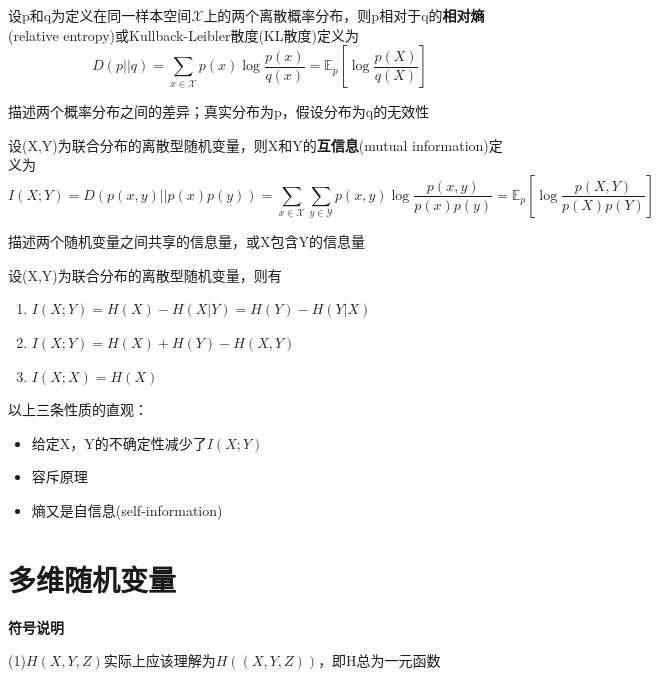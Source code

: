 \documentclass{ctexbook}
\begin{document}
\begin{definition}[相对熵]
    设p和q为定义在同一样本空间$\mathcal{X}$上的两个离散概率分布，则p相对于q的\textbf{相对熵}(relative entropy)或Kullback-Leibler散度(KL散度)定义为
    \[D(p||q) = \sum_{x \in \mathcal{X}} p(x) \log \frac{p(x)}{q(x)} = \mathbb{E} _p\left[\log \frac{p(X)}{q(X)}\right]\]
\end{definition}
\begin{remark}
    描述两个概率分布之间的差异；真实分布为p，假设分布为q的无效性
\end{remark}

\begin{definition}[互信息]
    设(X,Y)为联合分布的离散型随机变量，则X和Y的\textbf{互信息}(mutual information)定义为
    \[I(X;Y) = D(p(x,y)||p(x)p(y)) = \sum_{x \in \mathcal{X}} \sum_{y \in \mathcal{Y}} p(x,y) \log \frac{p(x,y)}{p(x)p(y)} = \mathbb{E} _p\left[\log \frac{p(X,Y)}{p(X)p(Y)}\right]\]
\end{definition}
\begin{remark}
    描述两个随机变量之间共享的信息量，或X包含Y的信息量
\end{remark}

\begin{proposition}[互信息的性质]
    设(X,Y)为联合分布的离散型随机变量，则有
    \begin{enumerate}
        \item $I(X;Y) = H(X) - H(X|Y) = H(Y) - H(Y|X)$
        \item $I(X;Y) = H(X) + H(Y) - H(X,Y)$
        \item $I(X;X) = H(X)$
    \end{enumerate}
\end{proposition}
\begin{remark}
    以上三条性质的直观：
    \begin{itemize}
        \item 给定X，Y的不确定性减少了$I(X;Y)$
        \item 容斥原理
        \item 熵又是自信息(self-information)
    \end{itemize}
\end{remark}

\section{多维随机变量}

\textbf{符号说明}

(1)$H(X,Y,Z)$实际上应该理解为$H((X,Y,Z))$，即H总为一元函数
\end{document}
